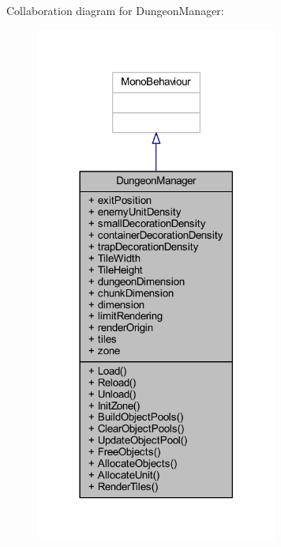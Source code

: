Collaboration diagram for Dungeon\+Manager\+:\nopagebreak
\begin{figure}[H]
\begin{center}
\leavevmode
\includegraphics[width=225pt]{class_dungeon_manager__coll__graph}
\end{center}
\end{figure}

